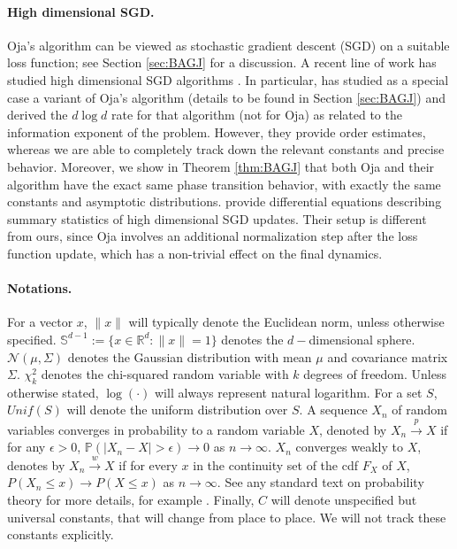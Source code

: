 \documentclass[12pt]{article}
\def\gN{{\mathcal{N}}}
\def\sP{{\mathbb{P}}}
\def\sR{{\mathbb{R}}}
\def\sS{{\mathbb{S}}}
\begin{document}
\paragraph{High dimensional SGD.} Oja's algorithm can be viewed as stochastic gradient descent (SGD) on a suitable loss function; see Section \ref{sec:BAGJ} for a discussion. A recent line of work has studied high dimensional SGD algorithms \citep{arous2021online,ben2022high,gheissari2025universality}. In particular, \citet{arous2021online} has studied as a special case a variant of Oja's algorithm (details to be found in Section \ref{sec:BAGJ}) and derived the $d\log d$ rate for that algorithm (not for Oja) as related to the information exponent of the problem. However, they provide order estimates, whereas we are able to completely track down the relevant constants and precise behavior. Moreover, we show in Theorem \ref{thm:BAGJ} that both Oja and their algorithm have the exact same phase transition behavior, with exactly the same constants and asymptotic distributions. \citet{ben2022high} provide differential equations describing summary statistics of high dimensional SGD updates. Their setup is different from ours, since Oja involves an additional normalization step after the loss function update, which has a non-trivial effect on the final dynamics.

\paragraph{Notations.} For a vector $x$, $\|x\|$ will typically denote the Euclidean norm, unless otherwise specified. $\sS^{d-1}:=\{x\in\sR^d:\|x\|=1\}$ denotes the $d-$dimensional sphere. $\gN(\mu,\Sigma)$ denotes the Gaussian distribution with mean $\mu$ and covariance matrix $\Sigma$. $\chi^2_k$ denotes the chi-squared random variable with $k$ degrees of freedom. Unless otherwise stated, $\log(\cdot)$ will always represent natural logarithm. For a set $S$, $Unif(S)$ will denote the uniform distribution over $S$. 
A sequence $X_n$ of random variables converges in probability to a random variable $X$, denoted by $X_n\stackrel{p}{\to}X$ if for any $\epsilon>0$, $\sP(|X_n-X|>\epsilon)\to 0$ as $n\to\infty$. $X_n$ converges weakly to $X$, denotes by $X_n\stackrel{w}{\to}X$ if for every $x$ in the continuity set of the cdf $F_X$ of $X$, $P(X_n\leq x)\to P(X\leq x)$ as $n\to\infty$. See any standard text on probability theory for more details, for example \citet{billingsley2017probability}.
Finally, $C$ will denote unspecified but universal constants, that will change from place to place. We will not track these constants explicitly.
\end{document}
